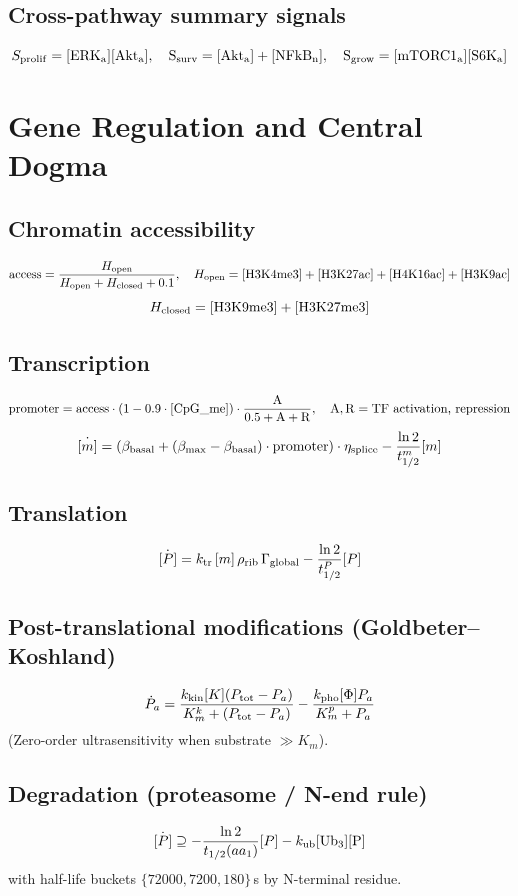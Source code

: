 \documentclass[11pt,a4paper]{article}
\newcommand{\eq}[1]{\begin{equation}#1\end{equation}}
\begin{document}
\subsection{Cross-pathway summary signals}
\eq{ S_{\rm prolif}=[\rm ERK_a][\rm Akt_a],\quad S_{\rm surv}=[\rm Akt_a]+[\rm NFkB_n],\quad S_{\rm grow}=[\rm mTORC1_a][\rm S6K_a] }

\clearpage
\section{Gene Regulation and Central Dogma}
\label{sec:genereg}

\subsection{Chromatin accessibility}
\eq{ \mathrm{access} = \frac{H_{\rm open}}{H_{\rm open}+H_{\rm closed}+0.1},\quad H_{\rm open}=[\rm H3K4me3]+[\rm H3K27ac]+[\rm H4K16ac]+[\rm H3K9ac] }
\eq{ H_{\rm closed}=[\rm H3K9me3]+[\rm H3K27me3] }

\subsection{Transcription}
\eq{ \mathrm{promoter} = \mathrm{access}\cdot(1-0.9\cdot[\rm CpG\_me])\cdot\frac{A}{0.5+A+R},\quad \mathrm{A,R}=\text{TF activation, repression} }
\eq{ \dot{[m]} = (\beta_{\rm basal} + (\beta_{\max}-\beta_{\rm basal})\cdot\mathrm{promoter})\cdot\eta_{\rm splice} - \frac{\ln 2}{t_{1/2}^m}[m] }

\subsection{Translation}
\eq{ \dot{[P]} = k_{\rm tr}\,[m]\,\rho_{\rm rib}\,\Gamma_{\rm global} - \frac{\ln 2}{t_{1/2}^P}[P] }

\subsection{Post-translational modifications (Goldbeter--Koshland)}
\eq{ \dot P_a = \frac{k_{\rm kin}[K](P_{\rm tot}-P_a)}{K_m^k+(P_{\rm tot}-P_a)} - \frac{k_{\rm pho}[\Phi]P_a}{K_m^p+P_a} }
(Zero-order ultrasensitivity when substrate $\gg K_m$).

\subsection{Degradation (proteasome / N-end rule)}
\eq{ \dot{[P]}\supseteq-\frac{\ln 2}{t_{1/2}(aa_1)}[P] - k_{\rm ub}[\rm Ub_3][P] }
with half-life buckets $\{72000, 7200, 180\}$\,s by N-terminal residue.
\end{document}
